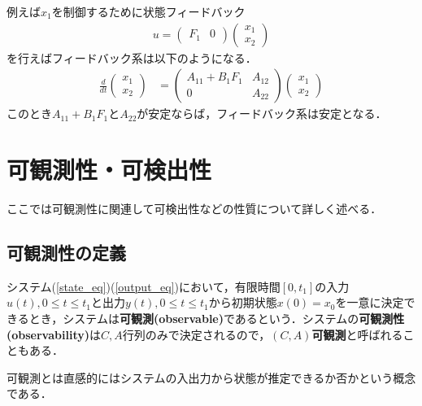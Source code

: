 例えば$x_1$を制御するために状態フィードバック
\begin{align}
	u = \left(
		\begin{array}{cc}
			F_1 & 0 
		\end{array}
	    \right)
	    \left(
		\begin{array}{c}
			x_1 \\
			x_2 
		\end{array}
	    \right)
\end{align}
を行えばフィードバック系は以下のようになる．
\begin{align}
 \frac{d}{dt}
  \left(\begin{array}{c}
         {x}_1 \\
	 {x}_2 
	\end{array}\right)
  &=
  \left(\begin{array}{cc}
         {A}_{11}+B_1 F_1 & {A}_{12} \\
	     0        & {A}_{22}
	\end{array}\right)
  \left(\begin{array}{c}
         {x}_1 \\
	 {x}_2 
	\end{array}\right)
\end{align}
このとき${A}_{11}+B_1 F_1$と${A}_{22}$が安定ならば，フィードバック系は安定となる．



\section{可観測性・可検出性}

ここでは可観測性に関連して可検出性などの性質について詳しく述べる．

\subsection{可観測性の定義}

システム(\ref{state_eq})(\ref{output_eq})において，有限時間$[0,t_1]$の入力$u(t),0 \leq t \leq t_1$と出力$y(t), 0 \leq t \leq t_1$から初期状態$x(0)=x_0$を一意に決定できるとき，システムは{\bf 可観測(observable)}であるという．システムの{\bf 可観測性(observability)}は$C,A$行列のみで決定されるので，{\bf $(C,A)$可観測}と呼ばれることもある．

可観測とは直感的にはシステムの入出力から状態が推定できるか否かという概念である．

